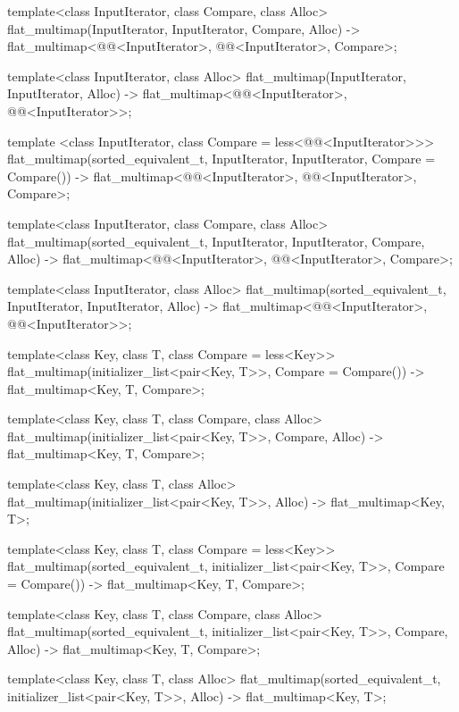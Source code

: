 \begin{codeblock}
\begin{codeblock}
\begin{codeblock}
\begin{addedblock}
\begin{codeblock}
{  template<class InputIterator, class Compare, class Alloc>
    flat_multimap(InputIterator, InputIterator, Compare, Alloc)
      -> flat_multimap<@@<InputIterator>, @@<InputIterator>, Compare>;

  template<class InputIterator, class Alloc>
    flat_multimap(InputIterator, InputIterator, Alloc)
      -> flat_multimap<@@<InputIterator>, @@<InputIterator>>;

  template <class InputIterator, class Compare = less<@@<InputIterator>>>
    flat_multimap(sorted_equivalent_t, InputIterator, InputIterator,
                  Compare = Compare())
      -> flat_multimap<@@<InputIterator>, @@<InputIterator>, Compare>;

  template<class InputIterator, class Compare, class Alloc>
    flat_multimap(sorted_equivalent_t, InputIterator, InputIterator, Compare, Alloc)
      -> flat_multimap<@@<InputIterator>, @@<InputIterator>, Compare>;

  template<class InputIterator, class Alloc>
    flat_multimap(sorted_equivalent_t, InputIterator, InputIterator, Alloc)
      -> flat_multimap<@@<InputIterator>, @@<InputIterator>>;

  template<class Key, class T, class Compare = less<Key>>
    flat_multimap(initializer_list<pair<Key, T>>, Compare = Compare())
      -> flat_multimap<Key, T, Compare>;

  template<class Key, class T, class Compare, class Alloc>
    flat_multimap(initializer_list<pair<Key, T>>, Compare, Alloc)
      -> flat_multimap<Key, T, Compare>;

  template<class Key, class T, class Alloc>
    flat_multimap(initializer_list<pair<Key, T>>, Alloc)
      -> flat_multimap<Key, T>;

  template<class Key, class T, class Compare = less<Key>>
  flat_multimap(sorted_equivalent_t, initializer_list<pair<Key, T>>,
                Compare = Compare())
      -> flat_multimap<Key, T, Compare>;

  template<class Key, class T, class Compare, class Alloc>
    flat_multimap(sorted_equivalent_t, initializer_list<pair<Key, T>>, Compare, Alloc)
      -> flat_multimap<Key, T, Compare>;

  template<class Key, class T, class Alloc>
    flat_multimap(sorted_equivalent_t, initializer_list<pair<Key, T>>, Alloc)
      -> flat_multimap<Key, T>;
}
\end{codeblock}


\end{addedblock}
\end{codeblock}
\end{codeblock}
\end{codeblock}
